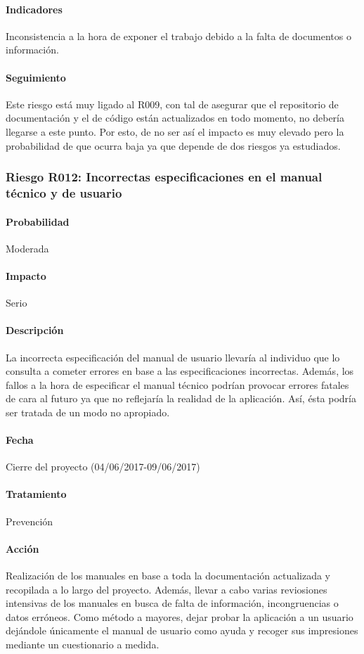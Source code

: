 \documentclass[10pt,a4paper]{article}
\begin{document}
				\paragraph{Indicadores} Inconsistencia a la hora de exponer el trabajo debido a la falta de documentos o información.
				\paragraph{Seguimiento}	Este riesgo está muy ligado al R009, con tal de asegurar que el repositorio de documentación y el de código están actualizados en todo momento, no debería llegarse a este punto. Por esto, de no ser así el impacto es muy elevado pero la probabilidad de que ocurra baja ya que depende de dos riesgos ya estudiados.			
				
			\subsubsection{Riesgo R012: Incorrectas especificaciones en el manual técnico y de usuario}
				\paragraph{Probabilidad} Moderada
				\paragraph{Impacto}	Serio
				\paragraph{Descripción} La incorrecta especificación del manual de usuario llevaría al individuo que lo consulta a cometer errores en base a las especificaciones incorrectas. Además, los fallos a la hora de especificar el manual técnico podrían provocar errores fatales de cara al futuro ya que no reflejaría la realidad de la aplicación. Así, ésta podría ser tratada de un modo no apropiado.
				\paragraph{Fecha} Cierre del proyecto (04/06/2017-09/06/2017)
				\paragraph{Tratamiento} Prevención
				\paragraph{Acción} Realización de los manuales en base a toda la documentación actualizada y recopilada a lo largo del proyecto. Además, llevar a cabo varias reviosiones intensivas de los manuales en busca de falta de información, incongruencias o datos erróneos. Como método a mayores, dejar probar la aplicación a un usuario dejándole únicamente el manual de usuario como ayuda y recoger sus impresiones mediante un cuestionario a medida.
\end{document}
